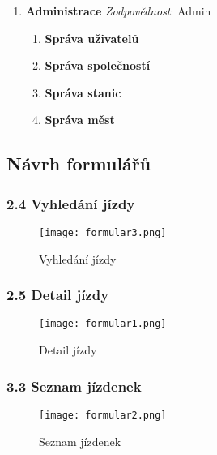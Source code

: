\documentclass[11pt]{article}
\begin{document}
\begin{enumerate}
    \item \textbf{Administrace}
        \textit{Zodpovědnost}: Admin
        \begin{enumerate}
            \item \textbf{Správa uživatelů}
            \item \textbf{Správa společností}
            \item \textbf{Správa stanic}
            \item \textbf{Správa měst}
        \end{enumerate}
\end{enumerate}


\subsection{Návrh formulářů}

\subsubsection*{2.4 Vyhledání jízdy}

\begin{figure}[H]
    \texttt{[image: formular3.png]}
    \centering
    \caption{Vyhledání jízdy}
    \label{vystup}
\end{figure}

\subsubsection*{2.5 Detail jízdy}

\begin{figure}[H]
    \texttt{[image: formular1.png]}
    \centering
    \caption{Detail jízdy}
    \label{vystup}
\end{figure}

\subsubsection*{3.3 Seznam jízdenek}

\begin{figure}[H]
    \texttt{[image: formular2.png]}
    \centering
    \caption{Seznam jízdenek}
    \label{vystup}
\end{figure}

\end{document}

